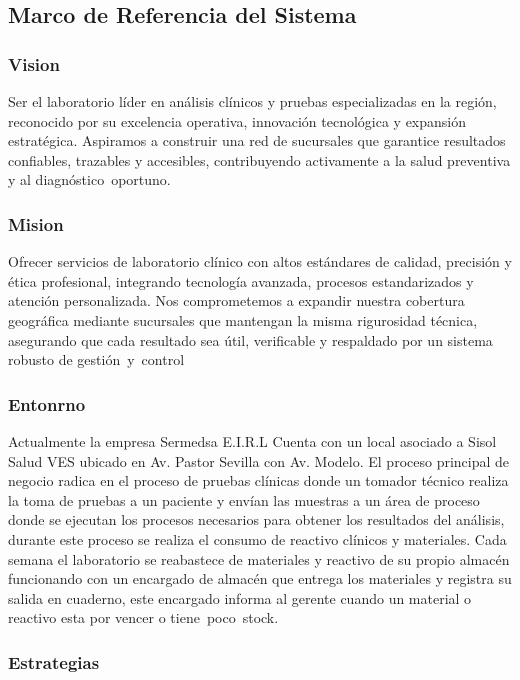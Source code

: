 \documentclass[12pt]{article} %
\begin{document}
\subsection{Marco de Referencia del Sistema}


\subsubsection{Vision}

Ser el laboratorio líder en análisis clínicos y pruebas especializadas en la región, reconocido por su excelencia operativa, innovación tecnológica y expansión estratégica. Aspiramos a construir una red de sucursales que garantice resultados confiables, trazables y accesibles, contribuyendo activamente a la salud preventiva y al diagnóstico oportuno.

\subsubsection{Mision}

Ofrecer servicios de laboratorio clínico con altos estándares de calidad, precisión y ética profesional, integrando tecnología avanzada, procesos estandarizados y atención personalizada. Nos comprometemos a expandir nuestra cobertura geográfica mediante sucursales que mantengan la misma rigurosidad técnica, asegurando que cada resultado sea útil, verificable y respaldado por un sistema robusto de gestión y control

\subsubsection{Entonrno}

Actualmente la empresa Sermedsa E.I.R.L Cuenta con un local asociado a Sisol Salud VES ubicado en Av. Pastor Sevilla con Av. Modelo. El proceso principal de negocio radica en el proceso de pruebas clínicas donde un tomador técnico realiza la toma de pruebas a un paciente y envían las muestras a un área de proceso donde se ejecutan los procesos necesarios para obtener los resultados del análisis, durante este proceso se realiza el consumo de reactivo clínicos y materiales. Cada semana el laboratorio se reabastece de materiales y reactivo de su propio almacén  funcionando con un encargado de almacén que entrega los materiales y registra su salida en cuaderno, este encargado informa al gerente cuando un material o reactivo esta por vencer o tiene poco stock.

\subsubsection{Estrategias}
\end{document}
